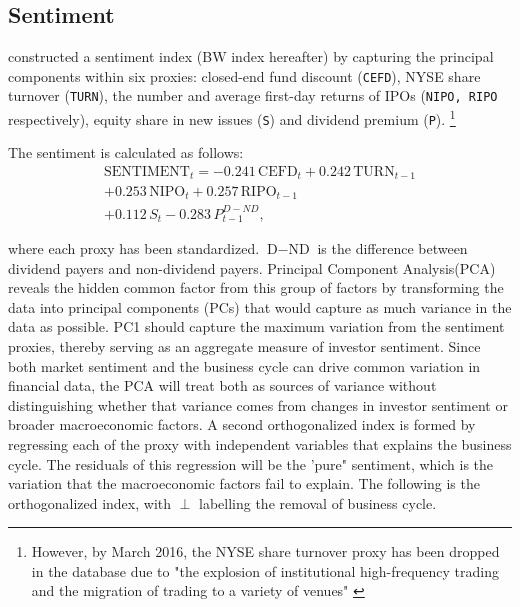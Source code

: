
\subsection{Sentiment}
 constructed a sentiment index (BW index hereafter) by capturing the principal components within six proxies: closed-end fund discount (\texttt{CEFD}), NYSE share turnover (\texttt{TURN}), the number and average first-day returns of IPOs (\texttt{NIPO, RIPO} respectively), equity share in new issues (\texttt{S}) and dividend premium (\texttt{P}). \footnote{However, by March 2016, the NYSE share turnover proxy has been dropped in the database due to "the explosion of institutional high-frequency trading and the migration of trading to a variety of venues" \cite{ung_2023}}%

The sentiment is calculated as follows:
\begin{equation}
    \label{eq:sentiment}
    \begin{split}
    \text{SENTIMENT}_t = -0.241\,\text{CEFD}_t + 0.242\,\text{TURN}_{t-1} \\ + 0.253\,\text{NIPO}_t 
    + 0.257\,\text{RIPO}_{t-1} \\ + 0.112\,S_t - 0.283\,P^{D-ND}_{t-1} , 
    \end{split}
\end{equation}

where each proxy has been standardized. $\text{D}-\text{ND}$ is the difference between dividend payers and non-dividend payers. Principal Component Analysis(PCA) reveals the hidden common factor from this group of factors by transforming the data into principal components (PCs) that would capture as much variance in the data as possible. PC1 should capture the maximum variation from the sentiment proxies, thereby serving as an aggregate measure of investor sentiment. Since both market sentiment and the business cycle can drive common variation in financial data, the PCA will treat both as sources of variance without distinguishing whether that variance comes from changes in investor sentiment or broader macroeconomic factors. A second orthogonalized index is formed by regressing each of the proxy with independent variables that explains the business cycle. The residuals of this regression will be the 'pure" sentiment, which is the variation that the macroeconomic factors fail to explain. The following is the orthogonalized index, with $\perp$ labelling the removal of business cycle. 

